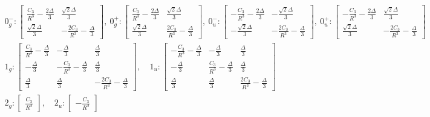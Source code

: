 \documentclass[prl, longbibliography]{revtex4-2}
\begin{document}
\begin{equation}
\begin{gathered}
0^{-}_{g}:
\begin{bmatrix}
\frac{C_3}{R^3}-\frac{2\Delta}{3} & \frac{\sqrt{2}\Delta}{3}\\
\frac{\sqrt{2}\Delta}{3}&-\frac{2C_3}{R^3}-\frac{\Delta}{3}
\end{bmatrix}, \ 
0^{+}_{g}:
\begin{bmatrix}
\frac{C_3}{R^3}-\frac{2\Delta}{3} & \frac{\sqrt{2}\Delta}{3}\\
\frac{\sqrt{2}\Delta}{3}&\frac{2C_3}{R^3}-\frac{\Delta}{3}
\end{bmatrix},  \ 
0^{-}_{u}:
\begin{bmatrix}
-\frac{C_3}{R^3}-\frac{2\Delta}{3} & -\frac{\sqrt{2}\Delta}{3}\\
-\frac{\sqrt{2}\Delta}{3}&-\frac{2C_3}{R^3}-\frac{\Delta}{3}
\end{bmatrix},  \ 
0^{+}_{u}:
\begin{bmatrix}
-\frac{C_3}{R^3}-\frac{2\Delta}{3} & \frac{\sqrt{2}\Delta}{3}\\
\frac{\sqrt{2}\Delta}{3}&-\frac{2C_3}{R^3}-\frac{\Delta}{3}
\end{bmatrix} \\
1_{g}:
\begin{bmatrix}
\frac{C_3}{R^3}-\frac{\Delta}{3} & -\frac{\Delta}{3}&\frac{\Delta}{3}\\
-\frac{\Delta}{3}&-\frac{C_3}{R^3}-\frac{\Delta}{3}&\frac{\Delta}{3}\\
\frac{\Delta}{3}&\frac{\Delta}{3}&-\frac{2C_3}{R^3}-\frac{\Delta}{3}
\end{bmatrix}, \quad
1_{u}:
\begin{bmatrix}
-\frac{C_3}{R^3}-\frac{\Delta}{3} & -\frac{\Delta}{3}&\frac{\Delta}{3}\\
-\frac{\Delta}{3}&\frac{C_3}{R^3}-\frac{\Delta}{3}&\frac{\Delta}{3}\\
\frac{\Delta}{3}&\frac{\Delta}{3}&\frac{2C_3}{R^3}-\frac{\Delta}{3}
\end{bmatrix} \\
2_{g}:
\begin{bmatrix}
\frac{C_3}{R^3}
\end{bmatrix}, \quad
2_{u}:
\begin{bmatrix}
-\frac{C_3}{R^3}
\end{bmatrix}
\end{gathered}
\end{equation}
\end{document}
